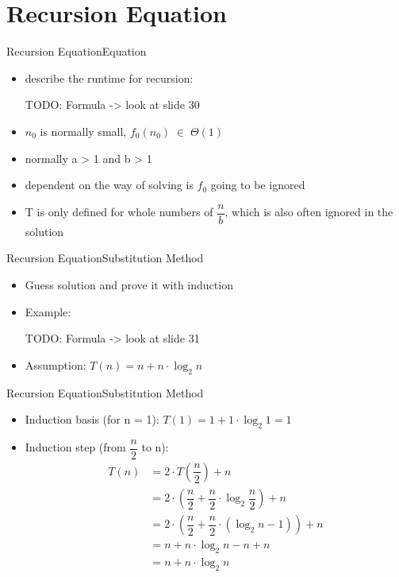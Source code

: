 \section{Recursion Equation}



\begin{frame}{Recursion Equation}{Equation}
	\begin{itemize}
		\item
			describe the runtime for recursion:
			
		TODO: Formula -> look at slide 30 \vspace{2em}
		
		\item
			$n_0$ is normally small, $f_0(n_0) \; \in \; \Theta(1)$
		\item
			normally a > 1 and b > 1 
		\item
			dependent on the way of solving is $f_0$ going to be ignored
		\item
			T is only defined for whole numbers of $\dfrac{n}{b}$, which is also 
			often ignored in the solution 
	\end{itemize}
\end{frame}


\begin{frame}{Recursion Equation}{Substitution Method}
	\begin{itemize}
		\item
			Guess solution and prove it with induction
		\item
			Example:
			
			TODO: Formula -> look at slide 31 \vspace{2em}
			
		\item
			Assumption:  $T(n) = n + n \cdot \log_2 n$
	\end{itemize}
\end{frame}


\begin{frame}{Recursion Equation}{Substitution Method}
	\begin{itemize}
		\item
			Induction basis (for n = 1): $T(1) = 1 + 1 \cdot \log_2 1 = 1$
		\item
			Induction step (from $\dfrac{n}{2}$ to n):
			\begin{align*}
				T(n) & = 2 \cdot T\left(\dfrac{n}{2}\right) + n \\
					{} & = 2 \cdot \left(\dfrac{n}{2} + \dfrac{n}{2} \cdot \log_2 
						 \dfrac{n}{2}\right) + n \\
					{} & = 2 \cdot \left(\dfrac{n}{2} + \dfrac{n}{2} \cdot \left(\log_2 
					n - 1\right)\right) + 
						 n\\
					{} & = n + n \cdot \log_2 n - n + n\\
					{} & = n + n \cdot \log_2 n
			\end{align*}
	\end{itemize}
\end{frame}

